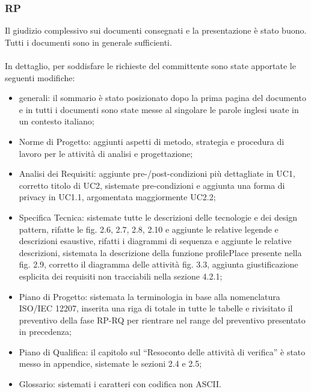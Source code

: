 \subsubsection*{RP}
Il giudizio complessivo sui documenti consegnati e la presentazione \`e stato
buono. Tutti i documenti sono in generale sufficienti.  \\ \\ In dettaglio, per
soddisfare le richieste del committente sono state apportate le seguenti modifiche:
\begin{itemize}
  \item generali: il sommario \`e stato posizionato dopo la prima pagina del
  documento e in tutti i documenti sono state messe al singolare le parole
  inglesi usate in un contesto italiano;
  \item Norme di Progetto: aggiunti aspetti di metodo, strategia e procedura di
  lavoro per le attivit\`a di analisi e progettazione;
  \item Analisi dei Requisiti: aggiunte pre-/post-condizioni pi\`u dettagliate
  in UC1, corretto titolo di UC2, sistemate pre-condizioni e aggiunta una forma
  di privacy in UC1.1, argomentata maggiormente UC2.2;
  \item Specifica Tecnica: sistemate tutte le descrizioni delle
  tecnologie e dei design pattern, rifatte le fig. 2.6, 2.7, 2.8, 2.10 e
  aggiunte le relative legende e descrizioni esaustive, rifatti i diagrammi di
  sequenza e aggiunte le relative descrizioni, sistemata la descrizione
  della funzione profilePlace presente nella fig. 2.9, corretto il diagramma
  delle attivit\`a fig. 3.3, aggiunta giustificazione esplicita dei requisiti
  non tracciabili nella sezione 4.2.1;
  \item Piano di Progetto: sistemata la terminologia in base alla nomenclatura
  ISO/IEC 12207, inserita una riga di totale in tutte le tabelle e rivisitato il
  preventivo della fase RP-RQ per rientrare nel range del preventivo presentato in precedenza;
  \item Piano di Qualifica: il capitolo sul ``Resoconto delle attivit\`a di
  verifica'' \`e stato messo in appendice, sistemate le sezioni 2.4 e 2.5;
  \item Glossario:  sistemati i caratteri con codifica non ASCII.
\end{itemize}

